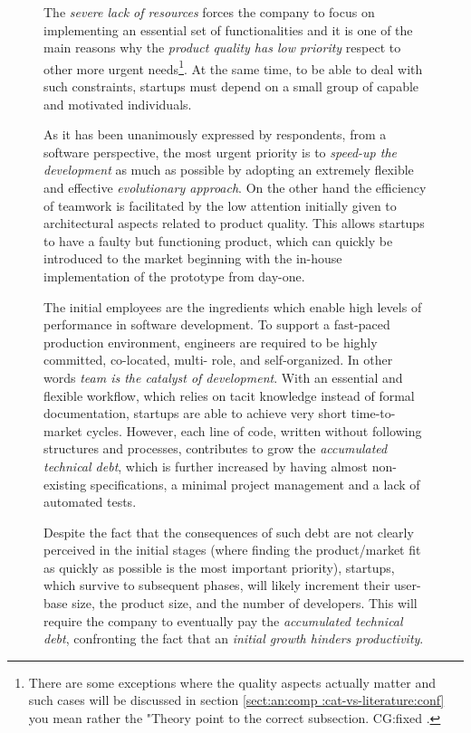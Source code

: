 \documentclass[12pt,journal,compsoc]{../sty/IEEEtran}
\begin{document}
\begin{table}[!t]
\begin{figure}[!t]
The \textit{severe lack of resources} forces the company to focus on
implementing an essential set of functionalities and it is one of the main
reasons why the \textit{product quality has low priority} respect to other more
urgent needs\footnote{There are some exceptions where the quality aspects
actually matter and such cases will be discussed in section \ref{sect:an:comp
:cat-vs-literature:conf}%
you mean rather the "Theory  %
point to the correct subsection. CG:fixed .}. At the same time, to be able to
deal with such constraints, startups must  depend on a small group of capable
and motivated individuals.

As it has been unanimously expressed by respondents, from a software
perspective, the most urgent priority is to \textit{speed-up the development} as
much as possible by adopting an extremely flexible and effective
\textit{evolutionary approach}. On the other hand the efficiency of teamwork is
facilitated by the low attention initially given to architectural aspects
related to product quality. This allows startups to have a faulty but
functioning product, which can quickly be introduced to the market beginning
with the in-house implementation of the prototype from day-one.

The initial employees are the ingredients which enable high levels of
performance in software development. To support a fast-paced production
environment, engineers are required to be highly committed, co-located,  multi-
role, and self-organized. In other words \textit{team is the catalyst of
development}. With an essential and flexible workflow, which relies on tacit
knowledge  instead of formal documentation, startups are able to achieve very
short  time-to-market cycles. However, each line of code, written without
following  structures and processes, contributes to grow the \textit{accumulated
technical  debt}, which is further increased by having almost non-existing
specifications,  a minimal project management and a lack of automated tests.

Despite the fact that the consequences of such debt are not clearly perceived
in the initial stages (where finding the product/market fit as quickly as
possible is the most important priority), startups, which survive to subsequent
phases, will likely increment their user-base size, the product size, and the
number of developers. This will require the company to eventually pay the
\textit{accumulated technical debt}, confronting the fact that an
\textit{initial growth hinders productivity}.


\end{figure}
\end{table}
\end{document}

